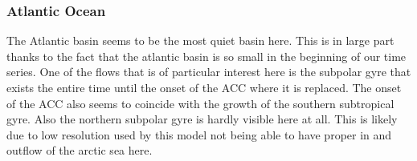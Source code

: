 \subsubsection{Atlantic Ocean}
The Atlantic basin seems to be the most quiet basin here. This is in large part thanks to the fact that the atlantic basin is so small in the beginning of our time series. One of the flows that is of particular interest here is the subpolar gyre that exists the entire time until the onset of the ACC where it is replaced. The onset of the ACC also seems to coincide with the growth of the southern subtropical gyre. Also the northern subpolar gyre is hardly visible here at all. This is likely due to low resolution used by this model not being able to have proper in and outflow of the arctic sea here. 


